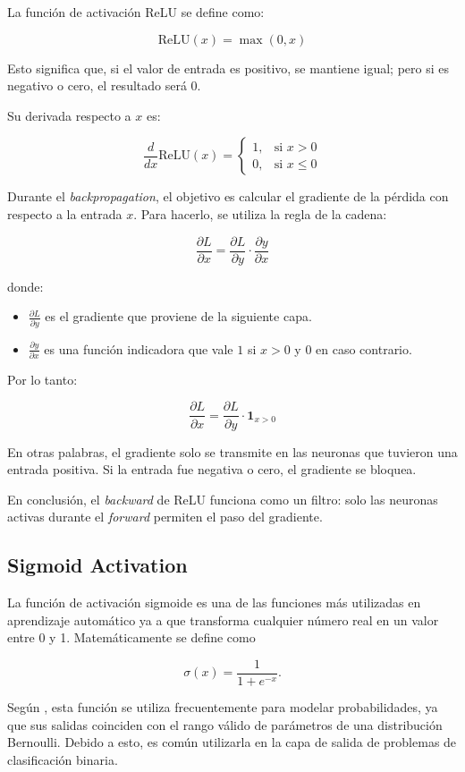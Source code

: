\documentclass[12pt]{article}
\begin{document}
La función de activación ReLU se define como:

\[
\text{ReLU}(x)=\max(0,x)
\]

Esto significa que, si el valor de entrada es positivo, se mantiene igual; pero si es negativo o cero, el resultado será $0$.

Su derivada respecto a $x$ es:

\[
\frac{d}{dx}\text{ReLU}(x)=
\begin{cases}
1, & \text{si } x>0 \\
0, & \text{si } x\le 0
\end{cases}
\]

Durante el \textit{backpropagation}, el objetivo es calcular el gradiente de la pérdida con respecto a la entrada $x$. Para hacerlo, se utiliza la regla de la cadena:

\[
\frac{\partial L}{\partial x}
=
\frac{\partial L}{\partial y}
\cdot
\frac{\partial y}{\partial x}
\]

donde:

\begin{itemize}
\item $\frac{\partial L}{\partial y}$ es el gradiente que proviene de la siguiente capa.
\item $\frac{\partial y}{\partial x}$ es una función indicadora que vale $1$ si $x>0$ y $0$ en caso contrario.
\end{itemize}

Por lo tanto:

\[
\frac{\partial L}{\partial x}
=
\frac{\partial L}{\partial y}
\cdot
\mathbf{1}_{x>0}
\]

En otras palabras, el gradiente solo se transmite en las neuronas que tuvieron una entrada positiva. Si la entrada fue negativa o cero, el gradiente se bloquea.

En conclusión, el \textit{backward} de ReLU funciona como un filtro: solo las neuronas activas durante el \textit{forward} permiten el paso del gradiente.

\subsection{Sigmoid Activation}
La función de activación sigmoide es una de las funciones más utilizadas en aprendizaje 
automático ya a que transforma cualquier número real en un valor entre 0 y 1. Matemáticamente se define como

$$
\sigma(x)=\frac{1}{1+e^{-x}}.
$$

Según \textcite{Goodfellow2016}, esta función se utiliza frecuentemente para modelar 
probabilidades, ya que sus salidas coinciden con el rango válido de parámetros 
de una distribución Bernoulli. Debido a esto, es común utilizarla en la capa de salida de problemas de 
clasificación binaria.
\end{document}
